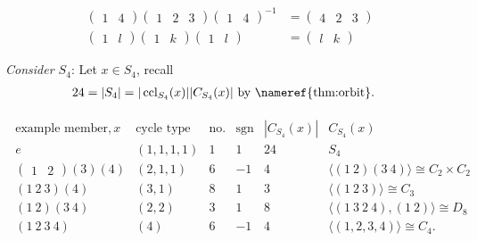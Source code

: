 \begin{example} ~\vspace*{-1.5\baselineskip}
    \begin{align*}
        \begin{pmatrix}1 & 4\end{pmatrix} \begin{pmatrix}1 & 2 & 3\end{pmatrix} \begin{pmatrix}1 & 4\end{pmatrix}^{-1} &= \begin{pmatrix}4 & 2 & 3\end{pmatrix} \\
        \begin{pmatrix}1 & l\end{pmatrix} \begin{pmatrix}1 & k\end{pmatrix} \begin{pmatrix}1 & l\end{pmatrix} &= \begin{pmatrix}l & k\end{pmatrix}
    \end{align*} 
\end{example} 

\emph{Consider $S_4$}: Let $x \in S_4$, recall 
\begin{align*}
    24 &= |S_4| = |\operatorname{ccl}_{S_4} (x)| |C_{S_4}(x)| \text{ by \nameref{thm:orbit}}.
\end{align*} 

\begin{align*}
    \begin{array}{cccccc}
        \text{example member}, x & \text{cycle type} & \text{no. of} & \operatorname{sgn} & |C_{S_4}(x)| & C_{S_4}(x) \\
        e & (1, 1, 1, 1) & 1 & 1 & 24 & S_4 \\
        \begin{pmatrix}1 & 2\end{pmatrix} (3)(4) & (2, 1, 1) & 6 & -1 & 4 & \langle (1\ 2) (3\ 4) \rangle \cong C_2 \times C_2 \\
        (1\ 2\ 3)(4) & (3, 1) & 8 & 1 & 3 & \langle (1\ 2\ 3) \rangle \cong C_3 \\
        (1\ 2) (3\ 4) & (2, 2) & 3 & 1 & 8 & \langle (1\ 3\ 2\ 4), (1\ 2) \rangle \cong D_8 \\
        (1\ 2\ 3\ 4) & (4) & 6 & -1 & 4 & \langle (1, 2, 3, 4) \rangle \cong C_4.
    \end{array}  
\end{align*} 

